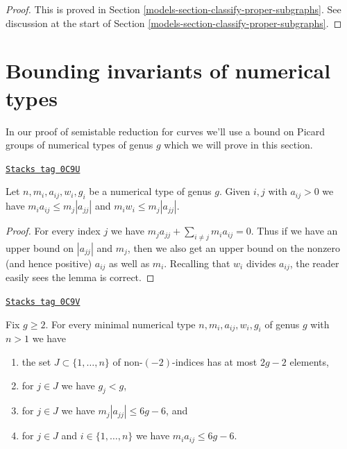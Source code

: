 \begin{proof}
This is proved in Section \ref{models-section-classify-proper-subgraphs}.
See discussion at the
start of Section \ref{models-section-classify-proper-subgraphs}.
\end{proof}

\section{Bounding invariants of numerical types}
\label{models-section-towards-classification}
In our proof of semistable reduction for curves we'll use a bound
on Picard groups of numerical types of genus $g$ which we will prove
in this section.

\begin{lemma}
\label{models-lemma-bound-neighbours}
\href{https://stacks.math.columbia.edu/tag/0C9U}{\texttt{Stacks tag 0C9U}}

Let $n, m_i, a_{ij}, w_i, g_i$ be a numerical type of genus $g$.
Given $i, j$ with $a_{ij} > 0$ we have
$m_ia_{ij} \leq m_j|a_{jj}|$ and $m_iw_i \leq m_j|a_{jj}|$.
\end{lemma}

\begin{proof}
For every index $j$ we have $m_j a_{jj} + \sum_{i \not = j} m_ia_{ij} = 0$.
Thus if we have an upper bound on $|a_{jj}|$ and $m_j$, then we also get an
upper bound on the nonzero (and hence positive) $a_{ij}$ as well as
$m_i$. Recalling that $w_i$ divides $a_{ij}$, the reader easily sees
the lemma is correct.
\end{proof}

\begin{lemma}
\label{models-lemma-bound-heart}
\href{https://stacks.math.columbia.edu/tag/0C9V}{\texttt{Stacks tag 0C9V}}

Fix $g \geq 2$. For every minimal numerical type $n, m_i, a_{ij}, w_i, g_i$
of genus $g$ with $n > 1$ we have
\begin{enumerate}
\item the set $J \subset \{1, \ldots, n\}$ of non-$(-2)$-indices
has at most $2g - 2$ elements,
\item for $j \in J$ we have $g_j < g$,
\item for $j \in J$ we have $m_j|a_{jj}| \leq 6g - 6$, and
\item for $j \in J$ and $i \in \{1, \ldots, n\}$
we have $m_ia_{ij} \leq 6g - 6$.
\end{enumerate}
\end{lemma}

